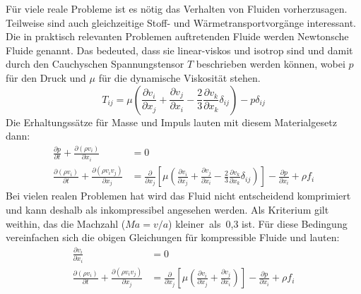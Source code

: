 Für viele reale Probleme ist es nötig das Verhalten von Fluiden vorherzusagen.
Teilweise sind auch gleichzeitige Stoff- und Wärmetransportvorgänge interessant.
Die in praktisch relevanten Problemen auftretenden Fluide werden Newtonsche Fluide genannt.
Das bedeuted, dass sie linear-viskos und isotrop sind und damit durch den Cauchyschen
Spannungstensor $T$ beschrieben werden können, wobei $p$ für den Druck und $\mu$ für die dynamische Viskosität stehen.
\begin{equation}
  T_{ij} = \mu\left({\frac{\partial v_i}{\partial x_j}
  + \frac{\partial v_j}{\partial x_i}
-\frac{2}{3} \frac{\partial v_k}{\partial x_k} \delta_{ij}}\right)
-p\delta_{ij}
\end{equation}
Die
Erhaltungssätze für Masse und Impuls lauten mit diesem Materialgesetz dann:
\begin{align}
  \frac{\partial p}{\partial t} + \frac{\partial (\rho v_i)}{\partial x_i} &= 0\\
  \frac{\partial (\rho v_i)}{\partial t} + \frac{\partial (\rho v_i v_j)}{\partial x_j} &=
  \frac{\partial}{\partial x_j} \left[{\mu
  \left({\frac{\partial v_i}{\partial x_j}
  +\frac{\partial v_j}{\partial x_i}
  - \frac{2}{3} \frac{\partial v_k}{\partial x_k}\delta_{ij}}\right)}\right]
  -\frac{\partial p}{\partial x_i} + \rho f_i
\end{align}
Bei
vielen realen Problemen hat wird das Fluid nicht entscheidend komprimiert
und kann deshalb als inkompressibel angesehen werden. Als Kriterium gilt weithin,
das die Machzahl ($Ma = v/a$) kleiner~als~0,3 ist.
Für diese Bedingung vereinfachen sich die obigen Gleichungen für kompressible Fluide und lauten:
\begin{align}
  \frac{\partial v_i}{\partial x_i} &= 0\\
  \frac{\partial (\rho v_i)}{\partial t} + \frac{\partial (\rho v_i v_j)}{\partial x_j} &=
  \frac{\partial}{\partial x_j} \left[{\mu
  \left({\frac{\partial v_i}{\partial x_j}
  +\frac{\partial v_j}{\partial x_i}}\right)}\right]
  -\frac{\partial p}{\partial x_i} + \rho f_i
\end{align}
\clearpage
